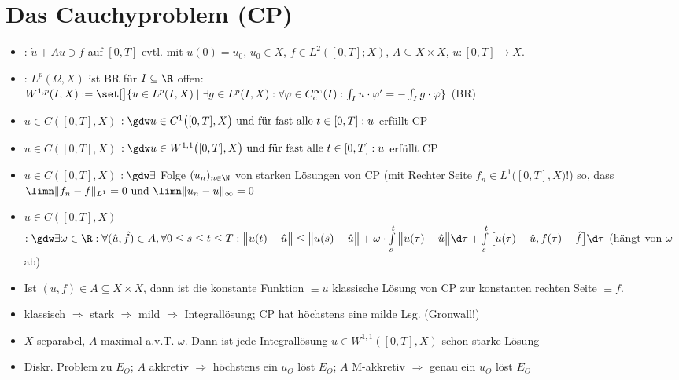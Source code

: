 	\section{Das Cauchyproblem (CP)}
	\begin{itemize}
		\item {}: $\dot{u}+Au\ni f$ auf $[0,T]$ evtl. mit $u(0)=u_0$, $u_0\in X$, $f\in L^2([0,T];X)$, $A\subseteq X\times X$, $u\colon[0,T]\to X$.
		\item {}: $L^p(\Omega,X)$ ist BR
		 für $I\subseteq\R$ offen:\\
		$W^{1,p}(I,X):=\set[\big]{u\in L^p(I,X)\mid\exists g\in L^p(I,X):\forall\varphi\in C_c^\infty(I):\int_I u\cdot\varphi'=-\int_I g\cdot\varphi}$ (BR)
		\item $u\in C([0,T],X)$  
		$:\gdw u\in C^1\big([0,T],X\big)\text{ und für fast alle }t\in[0,T]:u$ erfüllt CP
		\item $u\in C([0,T],X)$ 
		$:\gdw  u\in W^{1,1}\big([0,T],X\big)\text{ und für fast alle }t\in[0,T]:u$ erfüllt CP
		\item $u\in C([0,T],X)$ 
		$:\gdw \exists$ Folge $(u_n)_{n\in\N}$ von starken Lösungen von CP
		(mit Rechter Seite $f_n\in L^1\big([0,T],X\big)$!) so, dass
		$\limn\Vert f_n-f\Vert_{L^1}=0\text{ und }\limn\Vert u_n-u\Vert_\infty=0$
		\item $u\in C([0,T],X)$ 
		$:\gdw \exists\omega\in\R:\forall(\hat{u},\hat{f})\in A,\forall 0\leq s\leq t\leq T:\\
		\big\Vert u(t)-\hat{u}\big\Vert\leq\big\Vert u(s)-\hat{u}\big\Vert+\omega\cdot\int\limits_s^t\big\Vert u(\tau)-\hat{u}\big\Vert\d\tau+\int\limits_s^t\big[u(\tau)-\hat{u},f(\tau)-\hat{f}\big]\d\tau$ (hängt von $\omega$ ab)
		\item Ist $(u,f)\in A\subseteq X\times X$, dann ist die konstante Funktion $\equiv u$ klassische Lösung von CP zur konstanten rechten Seite $\equiv f$.
		\item klassisch $\Rightarrow$ stark $\Rightarrow$ mild $\Rightarrow$ Integrallösung; CP hat höchstens eine milde Lsg. (Gronwall!)
		\item $X$ separabel, $A$ maximal a.v.T. $\omega$. Dann ist jede Integrallösung $u\in W^{1,1}([0,T],X)$ schon starke Lösung
		\item Diskr. Problem zu $E_\Theta$; $A$ akkretiv $\Rightarrow$ höchstens ein $u_\Theta$ löst $E_\Theta$; $A$ M-akkretiv $\Rightarrow$ genau ein $u_\Theta$ löst $E_\Theta$
	\end{itemize}
	
